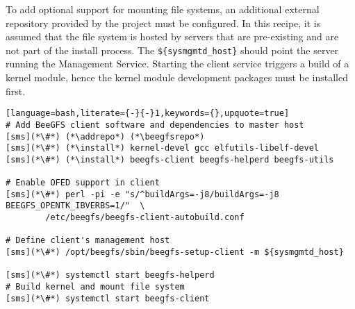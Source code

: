To add optional support for mounting \beegfs{} file systems, an 
additional external \pkgmgr{} repository provided by the \beegfs{} project must be 
configured.  In this recipe, it is
assumed that the file system is hosted by servers that are pre-existing
and are not part of the install process. The \texttt{\$\{sysmgmtd\_host\}} should
point the server running the \beegfs{} Management Service. Starting the client service triggers
a build of a kernel module, hence the kernel module development packages must be
installed first.

\begin{lstlisting}[language=bash,literate={-}{-}1,keywords={},upquote=true]
# Add BeeGFS client software and dependencies to master host
[sms](*\#*) (*\addrepo*) (*\beegfsrepo*)
[sms](*\#*) (*\install*) kernel-devel gcc elfutils-libelf-devel
[sms](*\#*) (*\install*) beegfs-client beegfs-helperd beegfs-utils

# Enable OFED support in client
[sms](*\#*) perl -pi -e "s/^buildArgs=-j8/buildArgs=-j8 BEEGFS_OPENTK_IBVERBS=1/"  \
        /etc/beegfs/beegfs-client-autobuild.conf

# Define client's management host
[sms](*\#*) /opt/beegfs/sbin/beegfs-setup-client -m ${sysmgmtd_host}

[sms](*\#*) systemctl start beegfs-helperd
# Build kernel and mount file system
[sms](*\#*) systemctl start beegfs-client
\end{lstlisting}


